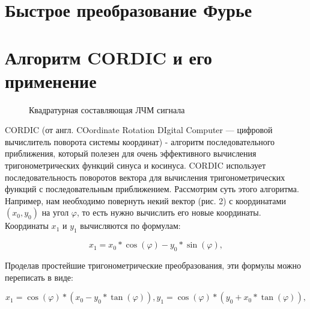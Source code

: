 \documentclass[a4paper,oneside ,14pt]{extreport}
\begin{document}
\section{Быстрое преобразование Фурье}

\section{Алгоритм CORDIC и его применение}

\begin{figure}[h]
    \centering
    \noindent
    \caption{Квадратурная составляющая ЛЧМ сигнала}
    \label{fig:chirp_q}
\end{figure}



CORDIC (от англ. COordinate Rotation DIgital Computer — цифровой вычислитель поворота системы координат) - алгоритм последовательного приближения, который полезен для очень эффективного вычисления тригонометрических функций синуса и косинуса. CORDIC использует последовательность поворотов вектора для вычисления тригонометрических функций с последовательным приближением. Рассмотрим суть этого алгоритма. Например, нам необходимо повернуть некий вектор (рис. 2) с координатами \((x_0, y_0)\) на угол \(\varphi\), то есть нужно вычислить его новые координаты. Координаты \(x_1\) и \(y_1\) вычисляются по формулам:

\begin{displaymath}	
x_{1} = x_0 * \cos(\varphi) - y_{0} * \sin(\varphi),
\end{displaymath}

Проделав простейшие тригонометрические преобразования, эти формулы можно переписать в виде:

\begin{displaymath}	
x_{1} = \cos(\varphi) * (x_{0} - y_{0} * \tan(\varphi)), 
y_{1} = \cos(\varphi) * (y_{0} + x_{0} * \tan(\varphi)),
\end{displaymath}
\end{document}
